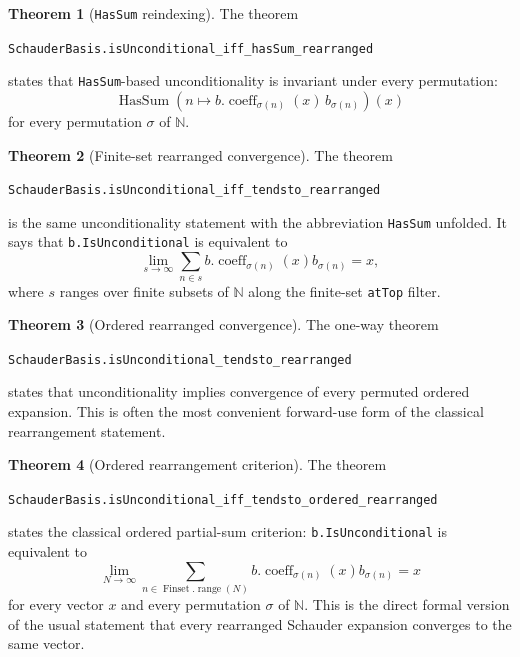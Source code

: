 \documentclass[12pt,a4paper]{article}
\theoremstyle{definition}
\newtheorem{theorem}{Theorem}[section]
\newcommand{\Nat}{\mathbb{N}}
\newcommand{\HasSum}{\operatorname{HasSum}}
\newcommand{\Finset}{\operatorname{Finset}}
\newcommand{\range}{\operatorname{range}}
\begin{document}
\begin{theorem}[\texorpdfstring{\texttt{HasSum}}{HasSum} reindexing]
The theorem
\begin{center}
\verb|SchauderBasis.isUnconditional_iff_hasSum_rearranged|
\end{center}
states that \verb|HasSum|-based unconditionality is invariant under every
permutation:
\[
  \HasSum\left(
    n\mapsto b.\operatorname{coeff}_{\sigma(n)}(x)\,b_{\sigma(n)}
  \right)(x)
\]
for every permutation $\sigma$ of $\Nat$.
\end{theorem}

\begin{theorem}[Finite-set rearranged convergence]
The theorem
\begin{center}
\verb|SchauderBasis.isUnconditional_iff_tendsto_rearranged|
\end{center}
is the same unconditionality statement with the abbreviation
\verb|HasSum| unfolded.  It says that \verb|b.IsUnconditional| is equivalent to
\[
  \lim_{s\to\infty}
  \sum_{n\in s}
    b.\operatorname{coeff}_{\sigma(n)}(x)b_{\sigma(n)}
  =
  x,
\]
where $s$ ranges over finite subsets of $\Nat$ along the finite-set
\verb|atTop| filter.
\end{theorem}

\begin{theorem}[Ordered rearranged convergence]
The one-way theorem
\begin{center}
\verb|SchauderBasis.isUnconditional_tendsto_rearranged|
\end{center}
states that unconditionality implies convergence of every permuted ordered
expansion.  This is often the most convenient forward-use form of the
classical rearrangement statement.
\end{theorem}

\begin{theorem}[Ordered rearrangement criterion]
The theorem
\begin{center}
\verb|SchauderBasis.isUnconditional_iff_tendsto_ordered_rearranged|
\end{center}
states the classical ordered partial-sum criterion:
\verb|b.IsUnconditional| is equivalent to
\[
  \lim_{N\to\infty}
  \sum_{n\in\Finset.\range(N)}
    b.\operatorname{coeff}_{\sigma(n)}(x)b_{\sigma(n)}
  =
  x
\]
for every vector $x$ and every permutation $\sigma$ of $\Nat$.  This is the
direct formal version of the usual statement that every rearranged Schauder
expansion converges to the same vector.
\end{theorem}
\end{document}
